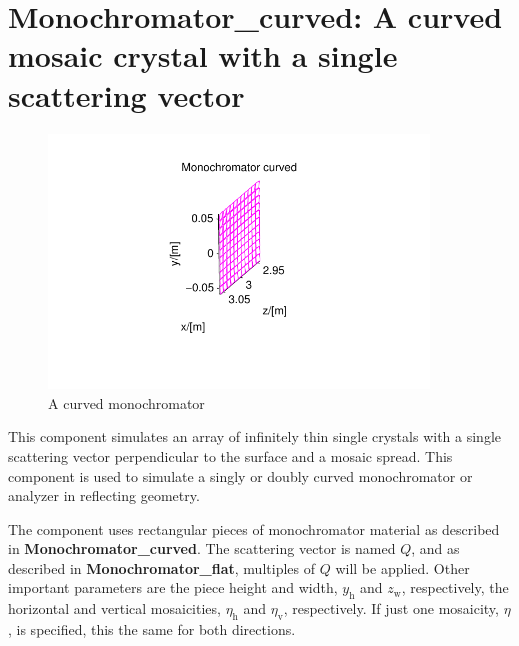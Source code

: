 \section{Monochromator\_curved: A curved mosaic crystal with
a single scattering vector}
\label{s:monochromator_curved}


\begin{figure}
  \begin{center}
    \includegraphics[width=0.9\textwidth]{figures/monochromator_curved}
  \end{center}
\caption{A curved monochromator}
\label{f:monochromator_curved}
\end{figure}


This component simulates an array of infinitely thin single
crystals with a single scattering vector perpendicular to the
surface and a mosaic spread.
This component is used to simulate a singly or doubly
curved monochromator or analyzer in reflecting geometry.

The component uses rectangular pieces of monochromator material
as described in \textbf{Monochromator\_curved}.
The scattering vector is named $Q$, and as described in
\textbf{Monochromator\_flat}, multiples of $Q$ will be applied.
Other important parameters are the piece height and width,
$y_\textrm{h}$ and $z_\textrm{w}$, respectively, the
horizontal and vertical mosaicities, $\eta_\textrm{h}$ and $\eta_\textrm{v}$,
respectively.
If just one mosaicity, $\eta$, is specified, this the same for both directions.

